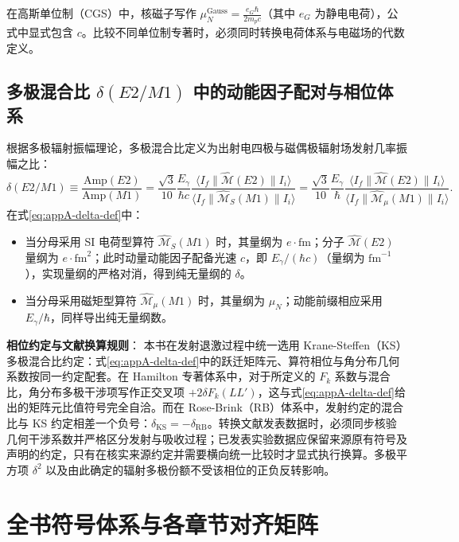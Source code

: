 在高斯单位制（CGS）中，核磁子写作 $\mu_N^{\mathrm{Gauss}} = \frac{e_G \hbar}{2 m_p c}$（其中 $e_G$ 为静电电荷），公式中显式包含 $c$。比较不同单位制专著时，必须同时转换电荷体系与电磁场的代数定义。

\subsection{多极混合比 $\delta(E2/M1)$ 中的动能因子配对与相位体系}
根据多极辐射振幅理论，多极混合比定义为出射电四极与磁偶极辐射场发射几率振幅之比：
\begin{equation}\label{eq:appA-delta-def}
\delta(E2/M1) \equiv \frac{\mathrm{Amp}(E2)}{\mathrm{Amp}(M1)} = \frac{\sqrt{3}}{10} \frac{E_\gamma}{\hbar c} \frac{\langle I_f \| \hat{\mathcal{M}}(E2) \| I_i \rangle}{\langle I_f \| \hat{\mathcal{M}}_S(M1) \| I_i \rangle} = \frac{\sqrt{3}}{10} \frac{E_\gamma}{\hbar} \frac{\langle I_f \| \hat{\mathcal{M}}(E2) \| I_i \rangle}{\langle I_f \| \hat{\mathcal{M}}_\mu(M1) \| I_i \rangle} .
\end{equation}
在式\eqref{eq:appA-delta-def}中：
\begin{itemize}
\item 当分母采用 SI 电荷型算符 $\hat{\mathcal{M}}_S(M1)$ 时，其量纲为 $e\cdot\mathrm{fm}$；分子 $\hat{\mathcal{M}}(E2)$ 量纲为 $e\cdot\mathrm{fm}^2$；此时动量动能因子配备光速 $c$，即 $E_\gamma / (\hbar c)$（量纲为 $\mathrm{fm}^{-1}$），实现量纲的严格对消，得到纯无量纲的 $\delta$。
\item 当分母采用磁矩型算符 $\hat{\mathcal{M}}_\mu(M1)$ 时，其量纲为 $\mu_N$；动能前缀相应采用 $E_\gamma / \hbar$，同样导出纯无量纲数。
\end{itemize}

\textbf{相位约定与文献换算规则}：
本书在发射退激过程中统一选用 Krane-Steffen（KS）多极混合比约定：式\eqref{eq:appA-delta-def}中的跃迁矩阵元、算符相位与角分布几何系数按同一约定配套。在 Hamilton 专著体系中，对于所定义的 $F_k$ 系数与混合比，角分布多极干涉项写作正交叉项 $+2\delta F_k(LL')$，这与式\eqref{eq:appA-delta-def}给出的矩阵元比值符号完全自洽。而在 Rose-Brink（RB）体系中，发射约定的混合比与 KS 约定相差一个负号：$\delta_{\mathrm{KS}} = -\delta_{\mathrm{RB}}$。转换文献发表数据时，必须同步核验几何干涉系数并严格区分发射与吸收过程；已发表实验数据应保留来源原有符号及声明的约定，只有在核实来源约定并需要横向统一比较时才显式执行换算。多极平方项 $\delta^2$ 以及由此确定的辐射多极份额不受该相位的正负反转影响。

\section{全书符号体系与各章节对齐矩阵}\label{sec:appA-7}

